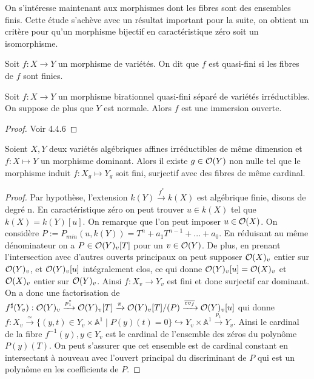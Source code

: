 On s'intéresse maintenant aux morphismes dont les fibres sont des ensembles finis. Cette étude s'achève avec un résultat important pour la suite, on obtient un critère pour qu'un morphisme bijectif en caractéristique zéro soit un isomorphisme. 

\begin{defn}
Soit $f:X \rightarrow Y$ un morphisme de variétés. On dit que $f$ est quasi-fini si les fibres de $f$ sont finies.
\end{defn}

\begin{thm}\label{ZMT}
Soit $f:X\rightarrow Y$ un morphisme birationnel quasi-fini séparé de variétés irréductibles. On suppose de plus que $Y$ est normale. Alors $f$ est une immersion ouverte.
\end{thm}
\begin{proof}
Voir \cite{QingLiu} 4.4.6
\end{proof}

\begin{prop}\label{fibersCardinal}
Soient $X,Y$ deux variétés algébriques affines irréductibles de même dimension et $f:X \mapsto Y$ un morphisme dominant. Alors il existe $g\in \mathcal{O}(Y)$ non nulle tel que le morphisme induit $f:X_g \mapsto Y_g$ soit fini, surjectif avec des fibres de même cardinal.
\end{prop}
\begin{proof}
Par hypothèse, l'extension $k(Y) \xrightarrow{f^*} k(X)$ est algébrique finie, disons de degré n. En caractéristique zéro on peut trouver $u\in k(X)$ tel que $k(X)=k(Y)[u]$. On remarque que l'on peut imposer $u\in \mathcal{O}(X)$. On considère $P:=P_{min}(u, k(Y))=T^n+a_1T^{n-1}+...+a_0$. En réduisant au même dénominateur on a $P\in \mathcal{O}(Y)_v[T]$ pour un $v\in \mathcal{O}(Y)$. De plus, en prenant l'intersection avec d'autres ouverts principaux on peut supposer $\mathcal{O}(X)_v$ entier sur $\mathcal{O}(Y)_v$, et $\mathcal{O}(Y)_v[u]$ intégralement clos, ce qui donne $\mathcal{O}(Y)_v[u]=\mathcal{O}(X)_v$ et $\mathcal{O}(X)_v$ entier sur $\mathcal{O}(Y)_v$. Ainsi $f:X_v \rightarrow Y_v$ est fini et donc surjectif car dominant.\\
On a donc une factorisation de $f^\sharp(Y_v):\mathcal{O}(Y)_v\xrightarrow{p_1^*}\mathcal{O}(Y)_v[T]\xrightarrow{\pi}\mathcal{O}(Y)_v[T]/(P)\xrightarrow{\overline{ev_f}}\mathcal{O}(Y)_v[u]$ qui donne $f:X_v \xrightarrow{\simeq} \lbrace (y,t) \in Y_v\times \mathbb{A}^1\mid P(y)(t)=0\rbrace \hookrightarrow Y_v\times \mathbb{A}^1 \xrightarrow{p_1} Y_v$. Ainsi le cardinal de la fibre $f^{-1}(y), y\in Y_v$ est le cardinal de l'ensemble des zéros du polynôme $P(y)(T)$. On peut s'assurer que cet ensemble est de cardinal constant en intersectant à nouveau avec l'ouvert principal du discriminant de $P$ qui est un polynôme en les coefficients de $P$.
\end{proof}

